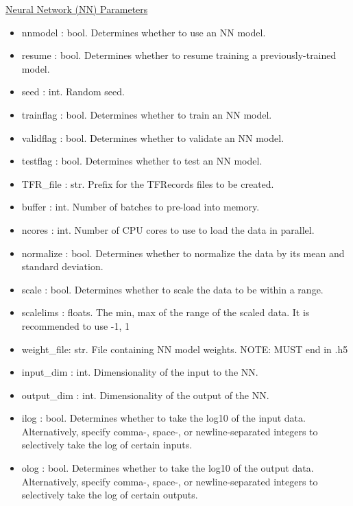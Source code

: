 \documentclass[letterpaper, 12pt]{article}
\begin{document}
\noindent \underline{Neural Network (NN) Parameters}
\begin{itemize}
\item nnmodel    : bool. Determines whether to use an NN model.
\item resume     : bool. Determines whether to resume training a previously-trained 
                   model.
\item seed       : int.  Random seed.
\item trainflag  : bool. Determines whether to train    an NN model.
\item validflag  : bool. Determines whether to validate an NN model.
\item testflag   : bool. Determines whether to test     an NN model.

\item TFR\_file  : str.  Prefix for the TFRecords files to be created.
\item buffer     : int.  Number of batches to pre-load into memory.
\item ncores     : int.  Number of CPU cores to use to load the data in parallel.

\item normalize  : bool. Determines whether to normalize the data by its mean and 
                   standard deviation.
\item scale      : bool. Determines whether to scale the data to be within a range.
\item scalelims  : floats. The min, max of the range of the scaled data.
                     It is recommended to use -1, 1

\item weight\_file: str.  File containing NN model weights.
                          NOTE: MUST end in .h5
\item input\_dim  : int.  Dimensionality of the input  to the NN.
\item output\_dim : int.  Dimensionality of the output of the NN.
\item ilog        : bool. Determines whether to take the log10 of the input  data.
                          Alternatively, specify comma-, space-, or newline-separated 
                          integers to selectively take the log of certain inputs.
\item olog        : bool. Determines whether to take the log10 of the output data.
                          Alternatively, specify comma-, space-, or newline-separated 
                          integers to selectively take the log of certain outputs.


\end{itemize}
\end{document}
